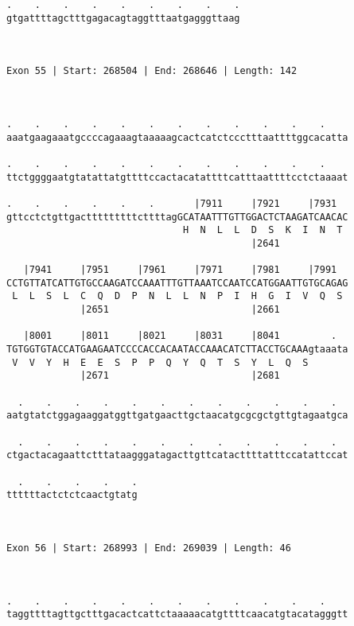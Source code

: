 \documentclass{article}
\begin{document}
\begin{Verbatim}
.    .    .    .    .    .    .    .    .
gtgattttagctttgagacagtaggtttaatgagggttaag
                                         
                                         
 
Exon 55 | Start: 268504 | End: 268646 | Length: 142



.    .    .    .    .    .    .    .    .    .    .    .    
aaatgaagaaatgccccagaaagtaaaaagcactcatctccctttaattttggcacatta
                                                            
.    .    .    .    .    .    .    .    .    .    .    .    
ttctggggaatgtatattatgttttccactacatattttcatttaattttcctctaaaat
                                                            
.    .    .    .    .    .       |7911     |7921     |7931  
gttcctctgttgactttttttttcttttagGCATAATTTGTTGGACTCTAAGATCAACAC
                               H  N  L  L  D  S  K  I  N  T 
                                           |2641            
  
   |7941     |7951     |7961     |7971     |7981     |7991  
CCTGTTATCATTGTGCCAAGATCCAAATTTGTTAAATCCAATCCATGGAATTGTGCAGAG
 L  L  S  L  C  Q  D  P  N  L  L  N  P  I  H  G  I  V  Q  S 
             |2651                         |2661            
  
   |8001     |8011     |8021     |8031     |8041         .  
TGTGGTGTACCATGAAGAATCCCCACCACAATACCAAACATCTTACCTGCAAAgtaaata
 V  V  Y  H  E  E  S  P  P  Q  Y  Q  T  S  Y  L  Q  S       
             |2671                         |2681            
  
  .    .    .    .    .    .    .    .    .    .    .    .  
aatgtatctggagaaggatggttgatgaacttgctaacatgcgcgctgttgtagaatgca
                                                            
  .    .    .    .    .    .    .    .    .    .    .    .  
ctgactacagaattctttataagggatagacttgttcatacttttatttccatattccat
                                                            
  .    .    .    .    .
ttttttactctctcaactgtatg
                       
                       
 
Exon 56 | Start: 268993 | End: 269039 | Length: 46



.    .    .    .    .    .    .    .    .    .    .    .    
taggttttagttgctttgacactcattctaaaaacatgttttcaacatgtacatagggtt
                                                            

\end{Verbatim}
\end{document}

